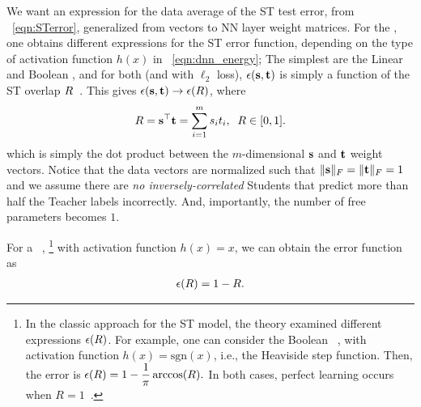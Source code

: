 We want an expression for the data average of the ST test error, from \EQN~\ref{eqn:STerror}, generalized from \Perceptron vectors to NN layer weight matrices.
For the \Perceptron, one obtains different expressions for the ST error function, depending on 
the type of activation function $h(x)$ in \EQN~\ref{eqn:dnn_energy};
The simplest are the Linear and Boolean \Perceptrons, and
for both (and with $\ell_2$ loss),
 $\epsilon({\mathbf{s}},{\mathbf{t}})$ is simply a function of the ST overlap $R$~\cite{SST92}.
This gives $\epsilon({\mathbf{s}}, {\mathbf{t}} )\rightarrow\epsilon(R)$, where
\begin{align}
  \label{eqn:Rdef}
R={\mathbf{s}}^{\top}{\mathbf{t}}=\sum_{i=1}^{m}s_{i}t_{i}, \;\;R\in[0,1].
\end{align}
which is simply the dot product between the $m$-dimensional \Student ${\mathbf{s}}$ and \Teacher ${\mathbf{t}}$ weight vectors.
 Notice that the data vectors are normalized such that $\Vert{\mathbf{s}}\Vert_{F}=\Vert
{\mathbf{t}}\Vert_{F}=1$ and 
we assume there are \emph{no inversely-correlated} Students that predict more than half the Teacher labels incorrectly. And, importantly, the number of free parameters becomes $1$.

For a \LinearPerceptron~\cite{SST92},%
\footnote{In the classic approach for the ST model, the theory examined different expressions $\epsilon(R)$.
For example, one can consider the  Boolean \Perceptron~\cite{SST92,Ros62}, with activation function $h(x)=\mbox{sgn}(x)$, 
i.e., the Heaviside step function. Then, the error is
$
\epsilon(R)=1 - \dfrac{1}{\pi}\arccos(R).
$
In both cases, perfect learning occurs when $R=1$~\cite{SST92}.
}
with activation function $h(x)=x$,  we can obtain the error function as
\begin{align}
\epsilon(R)=1-R.
\label{eqn:LinearPerceptronError}
\end{align}





